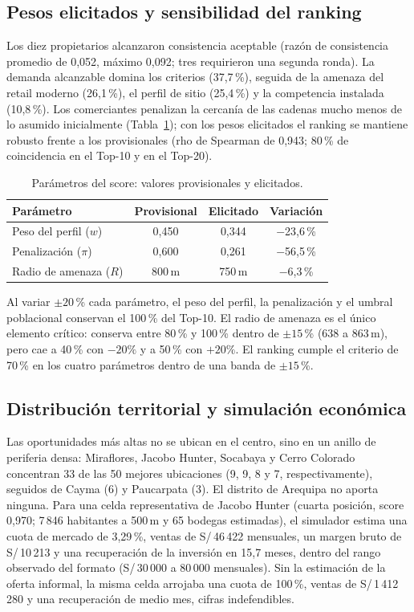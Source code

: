 \documentclass[10pt,letterpaper,twocolumn]{article}
\begin{document}
\subsection{Pesos elicitados y sensibilidad del ranking}

Los diez propietarios alcanzaron consistencia aceptable (razón de consistencia promedio de 0,052, máximo 0,092; tres requirieron una segunda ronda). La demanda alcanzable domina los criterios (37,7\,\%), seguida de la amenaza del retail moderno (26,1\,\%), el perfil de sitio (25,4\,\%) y la competencia instalada (10,8\,\%). Los comerciantes penalizan la cercanía de las cadenas mucho menos de lo asumido inicialmente (Tabla~\ref{tab:ahp}); con los pesos elicitados el ranking se mantiene robusto frente a los provisionales (rho de Spearman de 0,943; 80\,\% de coincidencia en el Top-10 y en el Top-20).

\begin{table}[t]
\centering
\caption{Parámetros del score: valores provisionales y elicitados.}
\label{tab:ahp}
\footnotesize
\begin{tabular}{lccc}
\toprule
Parámetro & Provisional & Elicitado & Variación \\
\midrule
Peso del perfil ($w$) & 0,450 & 0,344 & $-$23,6\,\% \\
Penalización ($\pi$) & 0,600 & 0,261 & $-$56,5\,\% \\
Radio de amenaza ($R$) & 800\,m & 750\,m & $-$6,3\,\% \\
\bottomrule
\end{tabular}
\end{table}

Al variar $\pm20$\,\% cada parámetro, el peso del perfil, la penalización y el umbral poblacional conservan el 100\,\% del Top-10. El radio de amenaza es el único elemento crítico: conserva entre 80\,\% y 100\,\% dentro de $\pm15$\,\% (638 a 863\,m), pero cae a 40\,\% con $-20\%$ y a 50\,\% con $+20\%$. El ranking cumple el criterio de 70\,\% en los cuatro parámetros dentro de una banda de $\pm15$\,\%.

\subsection{Distribución territorial y simulación económica}

Las oportunidades más altas no se ubican en el centro, sino en un anillo de periferia densa: Miraflores, Jacobo Hunter, Socabaya y Cerro Colorado concentran 33 de las 50 mejores ubicaciones (9, 9, 8 y 7, respectivamente), seguidos de Cayma (6) y Paucarpata (3). El distrito de Arequipa no aporta ninguna. Para una celda representativa de Jacobo Hunter (cuarta posición, score 0,970; 7\,846 habitantes a 500\,m y 65 bodegas estimadas), el simulador estima una cuota de mercado de 3,29\,\%, ventas de S/\,46\,422 mensuales, un margen bruto de S/\,10\,213 y una recuperación de la inversión en 15,7 meses, dentro del rango observado del formato (S/\,30\,000 a 80\,000 mensuales). Sin la estimación de la oferta informal, la misma celda arrojaba una cuota de 100\,\%, ventas de S/\,1\,412\,280 y una recuperación de medio mes, cifras indefendibles.
\end{document}
